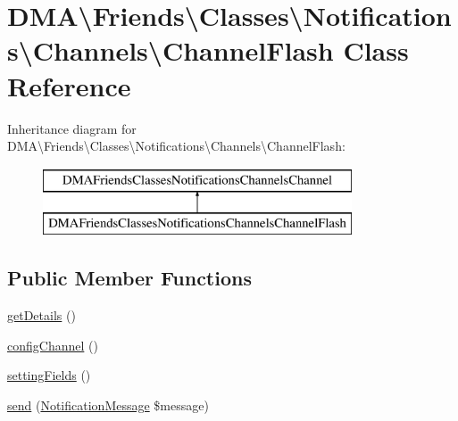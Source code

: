 \hypertarget{classDMA_1_1Friends_1_1Classes_1_1Notifications_1_1Channels_1_1ChannelFlash}{}\section{D\+M\+A\textbackslash{}Friends\textbackslash{}Classes\textbackslash{}Notifications\textbackslash{}Channels\textbackslash{}Channel\+Flash Class Reference}
\label{classDMA_1_1Friends_1_1Classes_1_1Notifications_1_1Channels_1_1ChannelFlash}
Inheritance diagram for D\+M\+A\textbackslash{}Friends\textbackslash{}Classes\textbackslash{}Notifications\textbackslash{}Channels\textbackslash{}Channel\+Flash\+:\begin{figure}[H]
\begin{center}
\leavevmode
\includegraphics[height=2.000000cm]{d0/d0a/classDMA_1_1Friends_1_1Classes_1_1Notifications_1_1Channels_1_1ChannelFlash}
\end{center}
\end{figure}
\subsection*{Public Member Functions}
\begin{DoxyCompactItemize}
\item 
\hyperlink{classDMA_1_1Friends_1_1Classes_1_1Notifications_1_1Channels_1_1ChannelFlash_a6091ca1294d5403b1296453707f999dc}{get\+Details} ()
\item 
\hyperlink{classDMA_1_1Friends_1_1Classes_1_1Notifications_1_1Channels_1_1ChannelFlash_a23aedb378d89657d3f4dc8e9d5816298}{config\+Channel} ()
\item 
\hyperlink{classDMA_1_1Friends_1_1Classes_1_1Notifications_1_1Channels_1_1ChannelFlash_a2723fe00029a298fba373d5397a11fb0}{setting\+Fields} ()
\item 
\hyperlink{classDMA_1_1Friends_1_1Classes_1_1Notifications_1_1Channels_1_1ChannelFlash_aca92ab6f8c53e038b7b29ab1243c18b5}{send} (\hyperlink{classDMA_1_1Friends_1_1Classes_1_1Notifications_1_1NotificationMessage}{Notification\+Message} \$message)
\end{DoxyCompactItemize}
